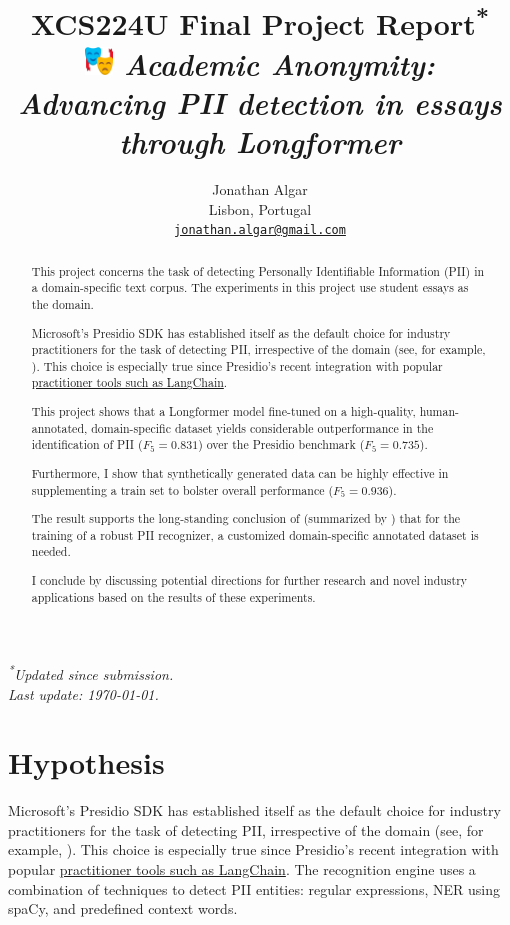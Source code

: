 \documentclass[11pt]{article}
\title{%
  XCS224U Final Project Report\textsuperscript{*} \\
  \includegraphics[height=1em]{images/emoji.png}%
  \hspace{0.1em} \textit{Academic Anonymity: Advancing PII detection in essays through Longformer}%
}
\author{Jonathan Algar \\
  Lisbon, Portugal \\
  \texttt{\href{mailto:jonathan.algar@gmail.com}{jonathan.algar@gmail.com}}
}
\begin{document}
\maketitle
\vspace{-1em}
\begin{center}
\small\textit{\textsuperscript{*}{Updated since submission. \\ Last update: \today}.}
\end{center}

\begin{abstract}

This project concerns the task of detecting Personally Identifiable Information (PII) in a domain-specific text corpus. The experiments in this project use student essays as the domain.

Microsoft's Presidio SDK \cite{Presidio} has established itself as the default choice for industry practitioners for the task of detecting PII, irrespective of the domain (see, for example, \citealt{AzizStraiton2023PIIDetection}). This choice is especially true since Presidio's recent integration with popular \href{https://python.langchain.com/docs/guides/productionization/safety/presidio_data_anonymization/}{practitioner tools such as LangChain}.

This project shows that a Longformer model \cite{abs-2004-05150} fine-tuned on a high-quality, human-annotated, domain-specific dataset yields considerable outperformance in the identification of PII ($F_5 = 0.831$) over the Presidio benchmark ($F_5 = 0.735$).

Furthermore, I show that synthetically generated data can be highly effective in supplementing a train set to bolster overall performance ($F_5 = 0.936$).

The result supports the long-standing conclusion of \citealt{Chen2015ASO} (summarized by \citealt{hathurusinghe-etal-2021-privacy}) that for the training of a robust PII recognizer, a customized domain-specific annotated dataset is needed.

I conclude by discussing potential directions for further research and novel industry applications based on the results of these experiments.

\end{abstract}

\section{Hypothesis}

Microsoft's Presidio SDK \cite{Presidio} has established itself as the default choice for industry practitioners for the task of detecting PII, irrespective of the domain (see, for example, \citealt{AzizStraiton2023PIIDetection}). This choice is especially true since Presidio's recent integration with popular \href{https://python.langchain.com/docs/guides/productionization/safety/presidio_data_anonymization/}{practitioner tools such as LangChain}. The recognition engine uses a combination of techniques to detect PII entities: regular expressions, NER using spaCy, and predefined context words.
\end{document}
